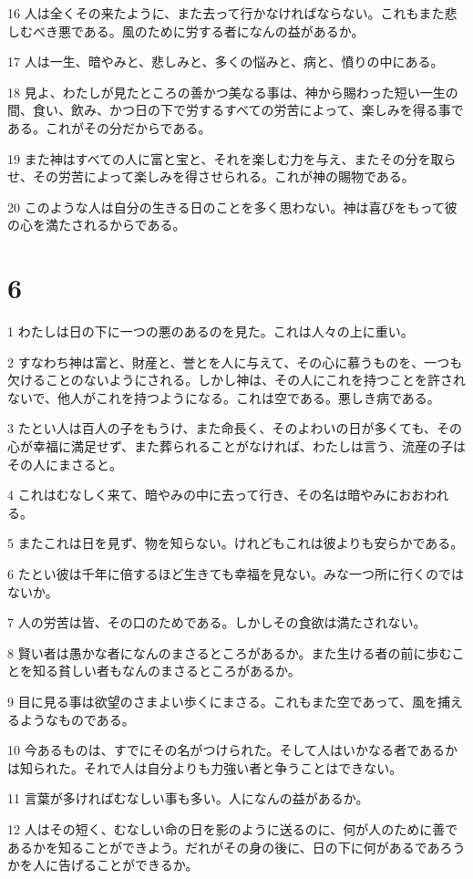 \par 16 人は全くその来たように、また去って行かなければならない。これもまた悲しむべき悪である。風のために労する者になんの益があるか。
\par 17 人は一生、暗やみと、悲しみと、多くの悩みと、病と、憤りの中にある。
\par 18 見よ、わたしが見たところの善かつ美なる事は、神から賜わった短い一生の間、食い、飲み、かつ日の下で労するすべての労苦によって、楽しみを得る事である。これがその分だからである。
\par 19 また神はすべての人に富と宝と、それを楽しむ力を与え、またその分を取らせ、その労苦によって楽しみを得させられる。これが神の賜物である。
\par 20 このような人は自分の生きる日のことを多く思わない。神は喜びをもって彼の心を満たされるからである。

\chapter{6}

\par 1 わたしは日の下に一つの悪のあるのを見た。これは人々の上に重い。
\par 2 すなわち神は富と、財産と、誉とを人に与えて、その心に慕うものを、一つも欠けることのないようにされる。しかし神は、その人にこれを持つことを許されないで、他人がこれを持つようになる。これは空である。悪しき病である。
\par 3 たとい人は百人の子をもうけ、また命長く、そのよわいの日が多くても、その心が幸福に満足せず、また葬られることがなければ、わたしは言う、流産の子はその人にまさると。
\par 4 これはむなしく来て、暗やみの中に去って行き、その名は暗やみにおおわれる。
\par 5 またこれは日を見ず、物を知らない。けれどもこれは彼よりも安らかである。
\par 6 たとい彼は千年に倍するほど生きても幸福を見ない。みな一つ所に行くのではないか。
\par 7 人の労苦は皆、その口のためである。しかしその食欲は満たされない。
\par 8 賢い者は愚かな者になんのまさるところがあるか。また生ける者の前に歩むことを知る貧しい者もなんのまさるところがあるか。
\par 9 目に見る事は欲望のさまよい歩くにまさる。これもまた空であって、風を捕えるようなものである。
\par 10 今あるものは、すでにその名がつけられた。そして人はいかなる者であるかは知られた。それで人は自分よりも力強い者と争うことはできない。
\par 11 言葉が多ければむなしい事も多い。人になんの益があるか。
\par 12 人はその短く、むなしい命の日を影のように送るのに、何が人のために善であるかを知ることができよう。だれがその身の後に、日の下に何があるであろうかを人に告げることができるか。

